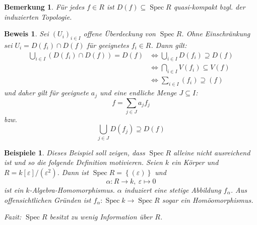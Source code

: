\documentclass[a4paper,oneside]{scrbook}
\theoremstyle{break}
\newtheorem{Bem}[Def]{Bemerkung}
\newtheorem{Bsp}[Def]{Beispiele}
\theoremstyle{nonumberbreak}
\theoremstyle{nonumberplain}
\newtheorem{Bew}{Beweis}
\theoremstyle{break}
\newcommand{\Spec}{%
	\ensuremath{\operatorname{Spec}}%
}
\begin{document}
\begin{Bem}
	Für jedes $f \in R$ ist $D\left(f\right) \subseteq \Spec R$ quasi-kompakt bzgl. der induzierten Topologie.
\end{Bem}
\begin{Bew}
	Sei $\left(U_i\right)_{i \in I}$ offene Überdeckung von $\Spec R$.
	Ohne Einschränkung sei $U_i = D\left(f_i\right) \cap D\left(f\right)$ für geeignetes $f_i \in R$.
	Dann gilt:
	\begin{align*}
		\bigcup_{i \in I} \left( D\left(f_i\right) \cap D\left(f\right) \right) = D\left(f\right) 
			& \Leftrightarrow \bigcup_{i \in I} D\left(f_i\right) \supseteq D\left(f\right) \\
			& \Leftrightarrow \bigcap_{i \in I} V\left(f_i\right) \subseteq V\left(f\right)\\
			& \Leftrightarrow \sum_{i \in I} \left(f_i\right) \supseteq \left(f\right)
	\end{align*}
	und daher gilt für geeignete $a_j$ und eine endliche Menge $J \subseteq I$:
	\[ f = \sum_{j \in J} a_j f_j \]
	bzw.
	\[ \bigcup_{j \in J} D\left(f_j\right) \supseteq  D\left(f\right) \]
\end{Bew}



\begin{Bsp}
	Dieses Beispiel soll zeigen, dass $\Spec R$ alleine nicht ausreichend ist und so die folgende Definition motivieren.
	Seien $k$ ein Körper und $R = k[\varepsilon] \big/ \left(\varepsilon^2\right)$.
	Dann ist $\Spec R = \left\{ \left( \varepsilon \right) \right\}$ und
	\[ \alpha\colon R \to k,\ \varepsilon \mapsto 0 \]
	ist ein $k$-Algebra-Homomorphismus. $\alpha$ induziert eine stetige Abbildung $f_\alpha$. 
	Aus offensichtlichen Gründen ist $f_{\alpha}\colon \Spec k \to \Spec R$ sogar ein Homöomorphismus.

	Fazit: $\Spec R$ besitzt zu wenig Information über $R$.
\end{Bsp}
\end{document}
